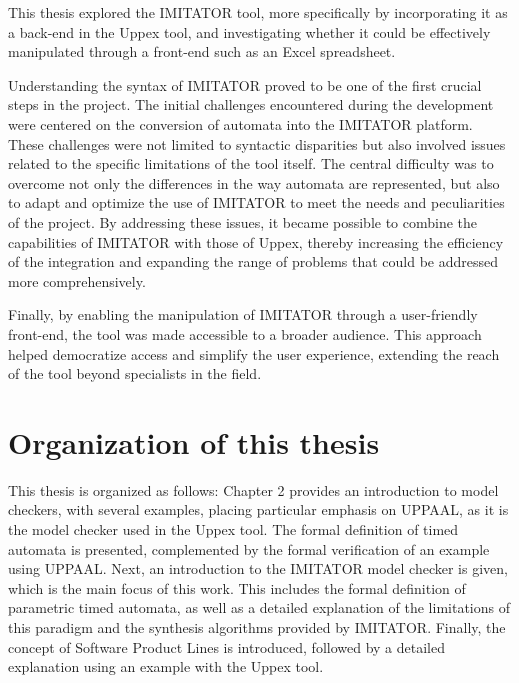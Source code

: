 This thesis explored the IMITATOR tool, more specifically by incorporating it as a back-end in the Uppex tool, and investigating whether it could be effectively manipulated through a front-end such as an Excel spreadsheet.

Understanding the syntax of IMITATOR proved to be one of the first crucial steps in the project. The initial challenges encountered during the development were centered on the conversion of automata into the IMITATOR platform. These challenges were not limited to syntactic disparities but also involved issues related to the specific limitations of the tool itself. The central difficulty was to overcome not only the differences in the way automata are represented, but also to adapt and optimize the use of IMITATOR to meet the needs and peculiarities of the project. By addressing these issues, it became possible to combine the capabilities of IMITATOR with those of Uppex, thereby increasing the efficiency of the integration and expanding the range of problems that could be addressed more comprehensively.

Finally, by enabling the manipulation of IMITATOR through a user-friendly front-end, the tool was made accessible to a broader audience. This approach helped democratize access and simplify the user experience, extending the reach of the tool beyond specialists in the field.


\section{Organization of this thesis}

This thesis is organized as follows: Chapter 2 provides an introduction to model checkers, with several examples, placing particular emphasis on UPPAAL, as it is the model checker used in the Uppex tool. The formal definition of timed automata is presented, complemented by the formal verification of an example using UPPAAL. Next, an introduction to the IMITATOR model checker is given, which is the main focus of this work. This includes the formal definition of parametric timed automata, as well as a detailed explanation of the limitations of this paradigm and the synthesis algorithms provided by IMITATOR. Finally, the concept of Software Product Lines is introduced, followed by a detailed explanation using an example with the Uppex tool.

